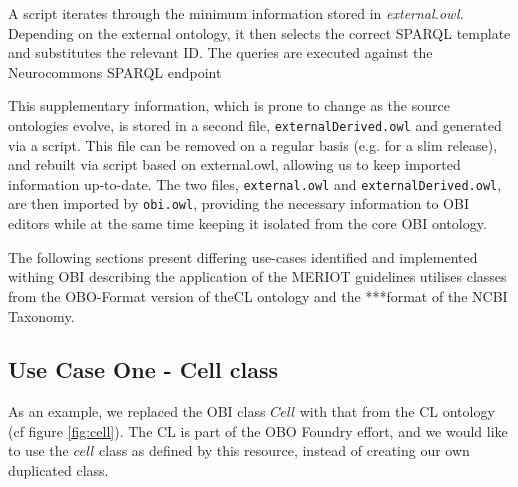 \documentclass[a4paper,10pt,twocolumn]{article}
\begin{document}
A script iterates through the minimum information stored in \emph{external.owl}.
Depending on the external ontology, it then selects the correct SPARQL template and substitutes the relevant ID.
The queries are executed against the Neurocommons SPARQL endpoint\cite{RefWorks:1540}

This supplementary information, which is prone to change as the source ontologies evolve, is stored in a second file, \texttt{externalDerived.owl} and generated via a script. 
This file can be removed on a regular basis (e.g. for a slim release), and rebuilt via script based on \texttt{}{external.owl}, allowing us to keep imported information up-to-date.
The two files, \texttt{external.owl} and \texttt{externalDerived.owl}, are then imported by \texttt{obi.owl}, providing the necessary information to OBI editors while at the same time keeping it isolated from the core OBI ontology.

The following sections present differing use-cases identified and implemented withing OBI describing the application of the MERIOT guidelines utilises classes from the \ac{OBO}-Format version of the\ac{CL} ontology and the ***format of the NCBI Taxonomy.

\subsection*{Use Case One - Cell class}

As an example, we replaced the \ac{OBI} class $Cell$ with that from the \ac{CL} ontology \cite{RefWorks:1559} (cf figure \ref{fig:cell}).
The \ac{CL} is part of the \ac{OBO} Foundry effort, and we would like to use the $cell$ class as defined by this resource, instead of creating our own duplicated class.
\end{document}
